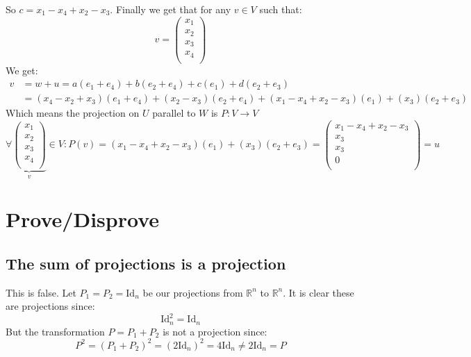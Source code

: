 \documentclass[11pt,a4paper]{article}
\theoremstyle{plain}
\newcommand{\R}{\mathbb{R}}
\begin{document}
	So $c = x_1 - x_4 + x_2 - x_3$. Finally we get that for any $v\in V$ such
	that:
	\[
		v =
		\begin{pmatrix}
	x_1\\
	x_2\\
	x_3\\
	x_4\\
		\end{pmatrix}	
	\]
	We get:
	\begin{align*}
		v &= w + u = a(e_1+e_4) + b(e_2+e_4) + c(e_1) + d(e_2+e_3) \\
		  &= (x_4-x_2+x_3)(e_1+e_4) + (x_2-x_3)(e_2+e_4) + 
		     (x_1 - x_4 + x_2 - x_3)(e_1) + (x_3)(e_2+e_3)
	\end{align*}
	Which means the projection on $U$ parallel to $W$ is $P\colon V\to V$
	\[
		\forall\underbrace{
		\begin{pmatrix}
	x_1\\
	x_2\\
	x_3\\
	x_4\\
		\end{pmatrix}}_v
		\in V \colon P(v) = (x_1 - x_4 + x_2 - x_3)(e_1) + (x_3)(e_2+e_3) = 
		\begin{pmatrix}
	x_1 - x_4 + x_2 - x_3\\
	x_3\\
	x_3\\
	0\\
		\end{pmatrix} = u
	\]

	
	\newpage
	
	\section{Prove/Disprove}
	\subsection{The sum of projections is a projection}
	This is false. Let $P_1 = P_2 = \mathrm{Id}_n$ be our projections from $\R^n$ to
	$\R^n$. It is clear these are projections since:
	\[ \mathrm{Id}_{n}^{2} = \mathrm{Id}_n \]
	But the transformation $P = P_1 + P_2$ is not a projection since:
	\[
		P^2 = (P_1 + P_2)^2 = (2\mathrm{Id}_n)^2 = 4\mathrm{Id}_n \neq 2\mathrm{Id}_n = P
	\]
	
\end{document}
